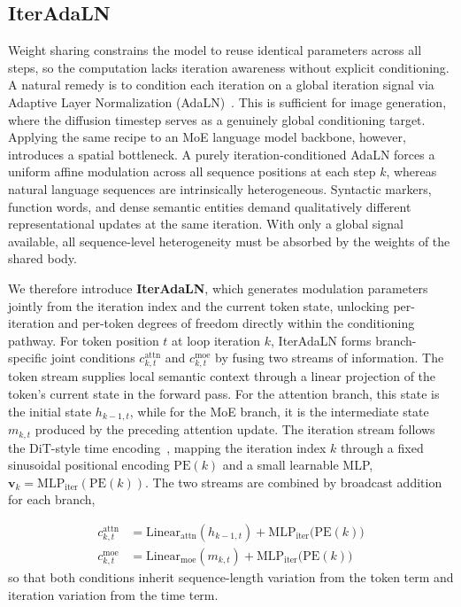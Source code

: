 \subsection{IterAdaLN}
\label{sec:method-tadaln}

Weight sharing constrains the model to reuse identical parameters across all steps, so the computation lacks iteration awareness without explicit conditioning. A natural remedy is to condition each iteration on a global iteration signal via Adaptive Layer Normalization (AdaLN)~\cite{peebles2023scalable}. This is sufficient for image generation, where the diffusion timestep serves as a genuinely global conditioning target. Applying the same recipe to an MoE language model backbone, however, introduces a spatial bottleneck. A purely iteration-conditioned AdaLN forces a uniform affine modulation across all sequence positions at each step $k$, whereas natural language sequences are intrinsically heterogeneous. Syntactic markers, function words, and dense semantic entities demand qualitatively different representational updates at the same iteration. With only a global signal available, all sequence-level heterogeneity must be absorbed by the weights of the shared body.

We therefore introduce \textbf{IterAdaLN}, which generates modulation parameters jointly from the iteration index and the current token state, unlocking per-iteration and per-token degrees of freedom directly within the conditioning pathway. For token position $t$ at loop iteration $k$, IterAdaLN forms branch-specific joint conditions $c^{\mathrm{attn}}_{k,t}$ and $c^{\mathrm{moe}}_{k,t}$ by fusing two streams of information. The token stream supplies local semantic context through a linear projection of the token's current state in the forward pass. For the attention branch, this state is the initial state $h_{k-1,t}$, while for the MoE branch, it is the intermediate state $m_{k,t}$ produced by the preceding attention update. The iteration stream follows the DiT-style time encoding~\cite{peebles2023scalable}, mapping the iteration index $k$ through a fixed sinusoidal positional encoding $\mathrm{PE}(k)$ and a small learnable MLP, $\mathbf{v}_k = \mathrm{MLP}_\mathrm{iter}(\mathrm{PE}(k))$. The two streams are combined by broadcast addition for each branch,

\begingroup
\small
\begin{align}
  c^{\mathrm{attn}}_{k,t} &= \mathrm{Linear}_{\mathrm{attn}}(h_{k-1,t})
              + \mathrm{MLP}_{\mathrm{iter}}\!\big(\mathrm{PE}(k)\big)
    \label{eq:c_kt_attn} \\
  c^{\mathrm{moe}}_{k,t} &= \mathrm{Linear}_{\mathrm{moe}}(m_{k,t})
              + \mathrm{MLP}_{\mathrm{iter}}\!\big(\mathrm{PE}(k)\big)
    \label{eq:c_kt_moe}
\end{align}
\endgroup
\noindent so that both conditions inherit sequence-length variation from the token term and iteration variation from the time term.


